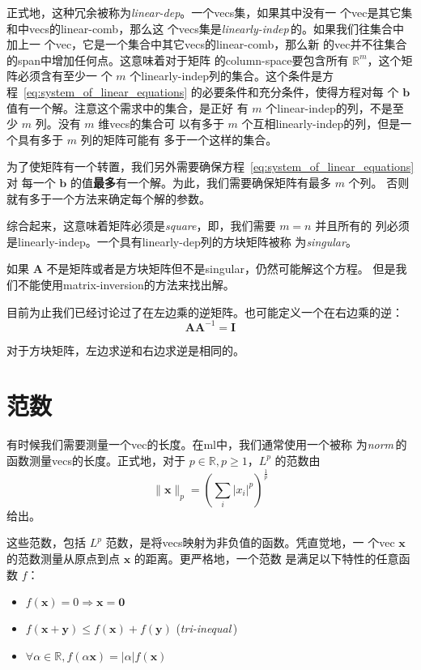 正式地，这种冗余被称为\emph{\gls{linear-dep}}。一个\gls*{vecs}集，如果其中没有一
个\gls*{vec}是其它集和中\gls*{vecs}的\gls*{linear-comb}，那么这
个\gls*{vecs}集是\emph{\gls{linearly-indep}}\,的。如果我们往集合中加上一
个\gls*{vec}，它是一个集合中其它\gls*{vecs}的\gls*{linear-comb}，那么新
的\gls*{vec}并不往集合的\gls*{span}中增加任何点。这意味着对于矩阵
的\gls*{column-space}要包含所有 $\mathbb{R}^m$，这个矩阵必须含有至少一
个 $m$ 个\gls*{linearly-indep}列的集合。这个条件是方
程~\ref{eq:system_of_linear_equations} 的必要条件和充分条件，使得方程对每
个 $\pmb{b}$ 值有一个解。注意这个需求中的集合，是正好
有 $m$ 个\gls*{linear-indep}的列，不是至少 $m$ 列。没有 $m$ 维\gls*{vecs}的集合可
以有多于 $m$ 个互相\gls*{linearly-indep}的列，但是一个具有多于 $m$ 列的矩阵可能有
多于一个这样的集合。

为了使矩阵有一个转置，我们另外需要确保方程~\ref{eq:system_of_linear_equations} 对
每一个 $\pmb{b}$ 的值\textbf{最多}有一个解。为此，我们需要确保矩阵有最多 $m$ 个列。
否则就有多于一个方法来确定每个解的参数。

综合起来，这意味着矩阵必须是\emph{\gls{square}}，即，我们需要 $m = n$ 并且所有的
列必须是\gls*{linearly-indep}。一个具有\gls*{linearly-dep}列的方块矩阵被称
为\emph{\gls{singular}}。

如果 $\pmb{A}$ 不是矩阵或者是方块矩阵但不是\gls*{singular}，仍然可能解这个方程。
但是我们不能使用\gls*{matrix-inversion}的方法来找出解。

目前为止我们已经讨论过了在左边乘的逆矩阵。也可能定义一个在右边乘的逆：
\begin{equation}
  \pmb{A}\pmb{A}^{-1} = \pmb{I}
\end{equation}

对于方块矩阵，左边求逆和右边求逆是相同的。

\section{范数}
\label{sec:norms}

有时候我们需要测量一个\gls*{vec}的长度。在\gls*{ml}中，我们通常使用一个被称
为\emph{\gls{norm}}\,的函数测量\gls*{vecs}的长度。正式地，对于
$p \in \mathbb{R}, p \geq 1$，$L^p$ 的范数由
\begin{equation}
  \|\pmb{x}\|_p = \left(\sum_i|x_i|^p\right)^{\frac{1}{p}}
\end{equation}
给出。

这些范数，包括 $L^p$ 范数，是将\gls*{vecs}映射为非负值的函数。凭直觉地，一
个\gls*{vec} $\pmb{x}$ 的范数测量从原点到点 $\pmb{x}$ 的距离。更严格地，一个范数
是满足以下特性的任意函数 $f$：
\begin{itemize}
\item $f(\pmb{x}) = 0 \Rightarrow \pmb{x} = \pmb{0}$
\item $f(\pmb{x} + \pmb{y}) \leq f(\pmb{x}) + f(\pmb{y})$
  (\emph{\gls{tri-inequal}}\,)
\item $\forall \alpha \in \mathbb{R}, f(\alpha \pmb{x}) = |\alpha|f(\pmb{x})$
\end{itemize}

